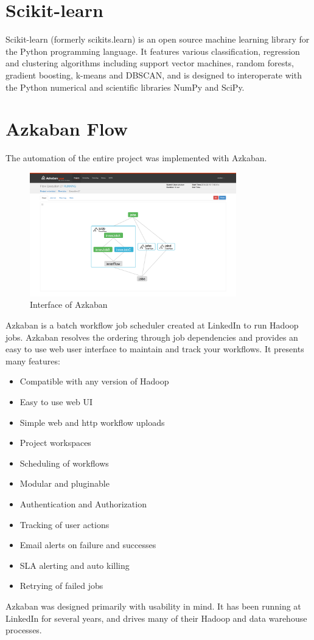 \section{Scikit-learn}

Scikit-learn (formerly scikits.learn) is an open source machine learning library for the Python programming language. It features various classification, regression and clustering algorithms including support vector machines, random forests, gradient boosting, k-means and DBSCAN, and is designed to interoperate with the Python numerical and scientific libraries NumPy and SciPy.

\section{Azkaban Flow}
The automation of the entire project was implemented with Azkaban.

\begin{figure}
\centering
\includegraphics[width=0.8\textwidth]{img/azk_base.png}
\caption{Interface of Azkaban}
\label{}
\end{figure}

Azkaban is a batch workflow job scheduler created at LinkedIn to run Hadoop jobs. Azkaban resolves the ordering through job dependencies and provides an easy to use web user interface to maintain and track your workflows.\cite{azka}
It presents many features:
\begin{itemize}
    \item Compatible with any version of Hadoop
    \item Easy to use web UI
    \item Simple web and http workflow uploads
    \item Project workspaces
    \item Scheduling of workflows
    \item Modular and pluginable
    \item Authentication and Authorization
    \item Tracking of user actions
    \item Email alerts on failure and successes
    \item SLA alerting and auto killing
    \item Retrying of failed jobs
\end{itemize}
Azkaban was designed primarily with usability in mind. It has been running at LinkedIn for several years, and drives many of their Hadoop and data warehouse processes.

